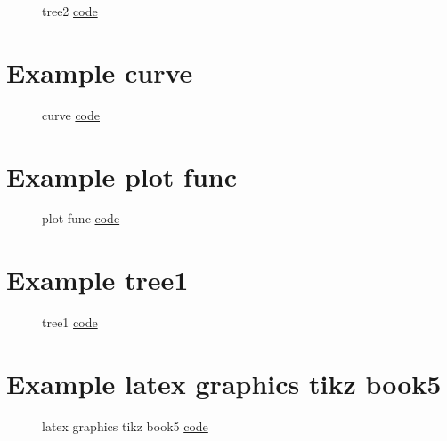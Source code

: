 \documentclass{article}
\begin{document}
\begin{figure}[H]
	\centering
	
	\caption{tree2 \href{https:/github.com/cauliyang/learn_tikz/blob/main/tree2.tex}{code} }
	\label{fig:tree2}
\end{figure}

\section{Example curve}

\begin{figure}[H]
	\centering
	
	\caption{curve \href{https:/github.com/cauliyang/learn_tikz/blob/main/curve.tex}{code} }
	\label{fig:curve}
\end{figure}

\section{Example plot func}

\begin{figure}[H]
	\centering
	
	\caption{plot func \href{https:/github.com/cauliyang/learn_tikz/blob/main/plot_func.tex}{code} }
	\label{fig:plot func}
\end{figure}

\section{Example tree1}

\begin{figure}[H]
	\centering
	
	\caption{tree1 \href{https:/github.com/cauliyang/learn_tikz/blob/main/tree1.tex}{code} }
	\label{fig:tree1}
\end{figure}

\section{Example latex graphics tikz book5}

\begin{figure}[H]
	\centering
	
	\caption{latex graphics tikz book5 \href{https:/github.com/cauliyang/learn_tikz/blob/main/latex_graphics_tikz_book5.tex}{code} }
	\label{fig:latex graphics tikz book5}
\end{figure}
\end{document}
